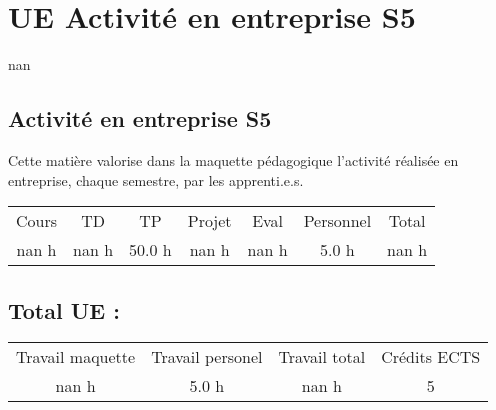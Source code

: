 \section{UE Activité en entreprise S5}%
\label{sec:UEActivitenentrepriseS5}%
nan%
\subsection{Activité en entreprise S5}%
\label{subsec:ActivitenentrepriseS5}%

%
Cette matière valorise dans la maquette pédagogique l'activité réalisée en entreprise, chaque semestre, par les apprenti.e.s.%
\begin{longtable}{c c c c c c c}%
\hline%
Cours&TD&TP&Projet&Eval&Personnel&Total\\%
nan h&nan h&50.0 h&nan h&nan h&5.0 h&nan h\\%
\hline%
\end{longtable}%
\subsection{Total UE :}%
\label{subsec:TotalUE}%

%
\begin{longtable}{c c c c}%
\hline%
Travail maquette&Travail personel&Travail total&Crédits ECTS\\%
nan h&5.0 h&nan h&5\\%
\hline%
\end{longtable}